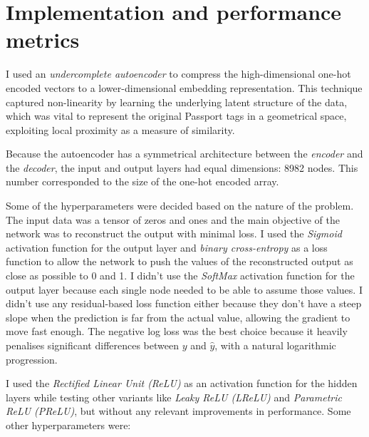 
\section{Implementation and performance metrics}

I used an \textit{undercomplete autoencoder} to compress the high-dimensional one-hot encoded vectors to a lower-dimensional embedding representation.
This technique captured non-linearity by learning the underlying latent structure of the data, which was vital to represent the original
Passport tags in a geometrical space, exploiting local proximity as a measure of similarity.

Because the autoencoder has a symmetrical architecture between the \textit{encoder} and the \textit{decoder},
the input and output layers had equal dimensions: 8982 nodes.
This number corresponded to the size of the one-hot encoded array.

Some of the hyperparameters were decided based on the nature of the problem. The input data was a tensor of zeros and ones
and the main objective of the network was to reconstruct the output with minimal loss.
I used the \textit{Sigmoid} activation function for the output layer and \textit{binary cross-entropy} as a loss function
to allow the network to push the values of the reconstructed output as close as possible to 0 and 1.
I didn't use the \textit{SoftMax} activation function for the output layer because each single node needed to be able
to assume those values.
I didn't use any residual-based loss function either because they don't have a steep slope when the prediction is far from the actual value,
allowing the gradient to move fast enough.
The negative log loss was the best choice because it heavily penalises significant differences between $y$ and $\hat{y}$,
with a natural logarithmic progression.

I used the \textit{Rectified Linear Unit (ReLU)} as an activation function for the hidden layers
while testing other variants like \textit{Leaky ReLU (LReLU)} and \textit{Parametric ReLU (PReLU)},
but without any relevant improvements in performance.
Some other hyperparameters were:

